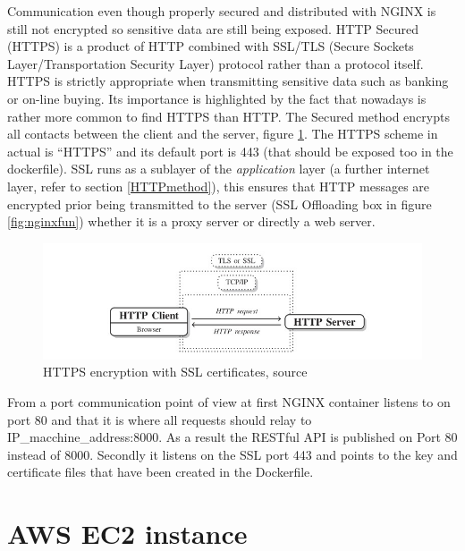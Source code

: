 \documentclass[
  12pt,
  a4paper,
  oneside]{book}
\theoremstyle{definition}
\theoremstyle{definition}
\theoremstyle{definition}
\theoremstyle{remark}
\begin{document}
Communication even though properly secured and distributed with NGINX is still not encrypted so sensitive data are still being exposed. HTTP Secured (HTTPS) is a product of HTTP combined with SSL/TLS (Secure Sockets Layer/Transportation Security Layer) protocol rather than a protocol itself. HTTPS is strictly appropriate when transmitting sensitive data such as banking or on-line buying. Its importance is highlighted by the fact that nowadays is rather more common to find HTTPS than HTTP. The Secured method encrypts all contacts between the client and the server, figure \ref{fig:httpsmeth}. The HTTPS scheme in actual is ``HTTPS'' and its default port is 443 (that should be exposed too in the dockerfile). SSL runs as a sublayer of the \emph{application} layer (a further internet layer, refer to section \ref{HTTPmethod}), this ensures that HTTP messages are encrypted prior being transmitted to the server (SSL Offloading box in figure \ref{fig:nginxfun}) whether it is a proxy server or directly a web server.

\begin{figure}
\centering
\includegraphics{images/https_method.jpg}
\caption{\label{fig:httpsmeth}HTTPS encryption with SSL certificates, source \citet{automateddatacollection}}
\end{figure}

From a port communication point of view at first NGINX container listens to on port 80 and that it is where all requests should relay to IP\_macchine\_address:8000. As a result the RESTful API is published on Port 80 instead of 8000. Secondly it listens on the SSL port 443 and points to the key and certificate files that have been created in the Dockerfile.

\hypertarget{aws}{%
\section{AWS EC2 instance}\label{aws}}
\end{document}
